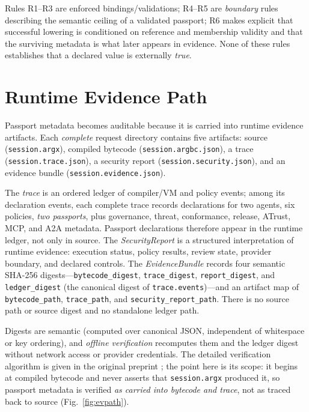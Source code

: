 \documentclass[conference]{IEEEtran}
\newcommand{\code}[1]{\texttt{\small #1}}
\begin{document}
Rules R1--R3 are enforced bindings/validations; R4--R5 are \emph{boundary} rules
describing the semantic ceiling of a validated passport; R6 makes explicit that
successful lowering is conditioned on reference and membership validity and that
the surviving metadata is what later appears in evidence. None of these rules
establishes that a declared value is externally \emph{true}.

\section{Runtime Evidence Path}\label{sec:evidence}
Passport metadata becomes auditable because it is carried into runtime evidence
artifacts. Each \emph{complete} request directory contains five artifacts:
source (\code{session.argx}), compiled bytecode (\code{session.argbc.json}), a
trace (\code{session.trace.json}), a security report
(\code{session.security.json}), and an evidence bundle
(\code{session.evidence.json}).

The \emph{trace} is an ordered ledger of compiler/VM and policy events; among its
declaration events, each complete trace records declarations for two agents, six
policies, \emph{two passports}, plus governance, threat, conformance, release,
ATrust, MCP, and A2A metadata. Passport declarations therefore appear in the
runtime ledger, not only in source. The \emph{SecurityReport} is a structured
interpretation of runtime evidence: execution status, policy results, review
state, provider boundary, and declared controls. The \emph{EvidenceBundle}
records four semantic SHA-256 digests---\code{bytecode\_digest},
\code{trace\_digest}, \code{report\_digest}, and \code{ledger\_digest} (the
canonical digest of \code{trace.events})---and an artifact map of
\code{bytecode\_path}, \code{trace\_path}, and \code{security\_report\_path}.
There is no source path or source digest and no standalone ledger path.

Digests are semantic (computed over canonical JSON, independent of whitespace or
key ordering), and \emph{offline verification} recomputes them and the ledger
digest without network access or provider credentials. The detailed verification
algorithm is given in the original preprint \cite{venegas2026argorixlang}; the
point here is its scope: it
begins at compiled bytecode and never asserts that \code{session.argx} produced
it, so passport metadata is verified \emph{as carried into bytecode and trace},
not as traced back to source (Fig.~\ref{fig:evpath}).
\end{document}
